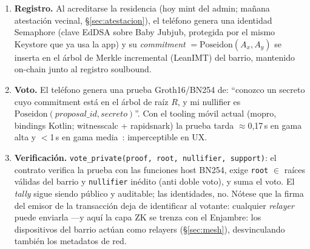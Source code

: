 \documentclass[twocolumn,10pt]{article}
\begin{document}
\begin{enumerate}
\item \textbf{Registro.} Al acreditarse la residencia (hoy mint del admin; ma\~nana atestaci\'on vecinal, \S\ref{sec:atestacion}), el tel\'efono genera una identidad Semaphore (clave EdDSA sobre Baby Jubjub, protegida por el mismo Keystore que ya usa la app) y su \emph{commitment} $=\mathrm{Poseidon}(A_x,A_y)$ se inserta en el \'arbol de Merkle incremental (LeanIMT) del barrio, mantenido on-chain junto al registro soulbound.
\item \textbf{Voto.} El tel\'efono genera una prueba Groth16/BN254 de: ``conozco un secreto cuyo commitment est\'a en el \'arbol de ra\'iz $R$, y mi nullifier es $\mathrm{Poseidon}(\mathit{proposal\_id}, \mathit{secreto})$''. Con el tooling m\'ovil actual (mopro, bindings Kotlin; witnesscalc + rapidsnark) la prueba tarda $\approx$0{,}17\,s en gama alta y $<$1\,s en gama media~\cite{mopro}: imperceptible en UX.
\item \textbf{Verificaci\'on.} \texttt{vote\_private(proof, root, nullifier, support)}: el contrato verifica la prueba con las funciones host BN254, exige \texttt{root} $\in$ ra\'ices v\'alidas del barrio y \texttt{nullifier} in\'edito (anti doble voto), y suma el voto. El \emph{tally} sigue siendo p\'ublico y auditable; las identidades, no. N\'otese que la firma del emisor de la transacci\'on deja de identificar al votante: cualquier \emph{relayer} puede enviarla ---y aqu\'i la capa ZK se trenza con el Enjambre: los dispositivos del barrio act\'uan como relayers (\S\ref{sec:mesh}), desvinculando tambi\'en los metadatos de red.
\end{enumerate}
\end{document}
